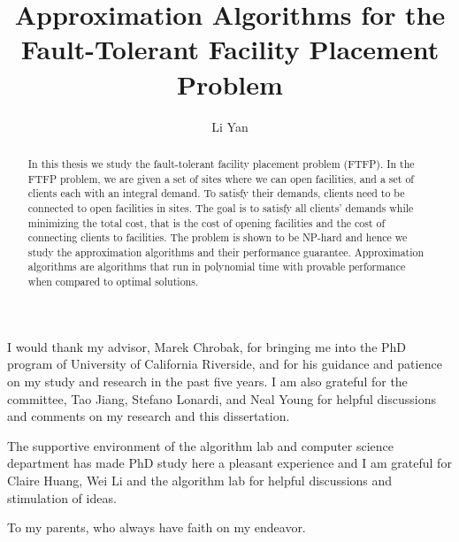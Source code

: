 \documentclass[oneside,final]{ucr}
\begin{document}

\title{Approximation Algorithms for the Fault-Tolerant Facility Placement Problem}
\author{Li Yan}

\maketitle
\copyrightpage{}
\approvalpage{}


\begin{frontmatter}

\begin{acknowledgements}
  I would thank my advisor, Marek Chrobak, for bringing me
  into the PhD program of University of California
  Riverside, and for his guidance and patience on my study
  and research in the past five years. I am also grateful
  for the committee, Tao Jiang, Stefano Lonardi, and Neal
  Young for helpful discussions and comments on my research
  and this dissertation.

  The supportive environment of the algorithm lab and
  computer science department has made PhD study here a
  pleasant experience and I am grateful for Claire Huang,
  Wei Li and the algorithm lab for helpful discussions and
  stimulation of ideas.
\end{acknowledgements}

\begin{dedication}
\null\vfil
{\large
\begin{center}
  To my parents, who always have faith on my endeavor.
\end{center}}
\vfil\null
\end{dedication}

\begin{abstract}
  In this thesis we study the fault-tolerant facility
  placement problem (FTFP). In the FTFP problem, we are
  given a set of sites where we can open facilities, and a
  set of clients each with an integral demand. To satisfy
  their demands, clients need to be connected to open
  facilities in sites. The goal is to satisfy all clients'
  demands while minimizing the total cost, that is the cost
  of opening facilities and the cost of connecting clients
  to facilities. The problem is shown to be NP-hard and
  hence we study the approximation algorithms and their
  performance guarantee. Approximation algorithms are
  algorithms that run in polynomial time with provable
  performance when compared to optimal solutions.


\end{abstract}
\end{frontmatter}
\end{document}
